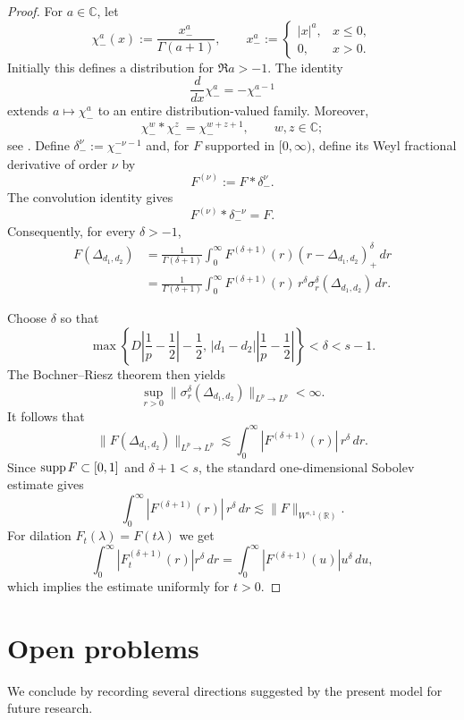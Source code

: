 \documentclass[12pt]{amsart}
\newcommand\Lapd{\Delta_{d_1, d_2}}
\newcommand{\supp}{{\rm supp}{\hspace{.05cm}}}
\begin{document}
\begin{proof}
For \(a\in\mathbb C\), let
\[
    \chi_-^a(x)
    :=
    \frac{x_-^a}{\Gamma(a+1)},
    \qquad
    x_-^a
    :=
    \begin{cases}
        |x|^a, & x\leq 0,\\
        0,     & x>0.
    \end{cases}
\]
Initially this defines a distribution for \(\Re a>-1\). The identity
\[
    \frac{d}{dx}\chi_-^a=-\chi_-^{a-1}
\]
extends \(a\mapsto\chi_-^a\) to an entire distribution-valued family.
Moreover,
\[
    \chi_-^w*\chi_-^z=\chi_-^{w+z+1},
    \qquad w,z\in\mathbb C;
\]
see \cite[(3.4.10)]{Hormander}. Define $\delta_-^\nu:=\chi_-^{-\nu-1}$
and, for \(F\) supported in \([0,\infty)\), define its Weyl fractional
derivative of order \(\nu\) by
\[
    F^{(\nu)}:=F*\delta_-^\nu.
\]
The convolution identity gives
\[
    F^{(\nu)}*\delta_-^{-\nu}=F.
\]
Consequently, for every \(\delta>-1\),
\[
\begin{aligned}
    F(\Lapd)
    &=
    \frac{1}{\Gamma(\delta+1)}
    \int_0^\infty
        F^{(\delta+1)}(r)
        (r-\Lapd)_+^\delta\,dr \\
    &=
    \frac{1}{\Gamma(\delta+1)}
    \int_0^\infty
        F^{(\delta+1)}(r)\,
        r^\delta
        \sigma_r^\delta(\Lapd)\,dr .
\end{aligned}
\]

Choose \(\delta\) so that
\[
    \max\left\{
        D\left|\frac1p-\frac12\right|-\frac12,\,
        |d_1-d_2|
        \left|\frac1p-\frac12\right|
    \right\}
    <\delta<s-1.
\]
The Bochner--Riesz theorem then yields
\[
    \sup_{r>0}
    \|\sigma_r^\delta(\Lapd)\|_{L^p\to L^p}
    <\infty.
\]
It follows that
\[
    \|F(\Lapd)\|_{L^p\to L^p}
    \lesssim
    \int_0^\infty
        |F^{(\delta+1)}(r)|\,r^\delta\,dr.
\]
Since \(\supp F\subset[0,1]\) and \(\delta+1<s\), the standard
one-dimensional Sobolev estimate gives
\[
    \int_0^\infty
        |F^{(\delta+1)}(r)|\,r^\delta\,dr
    \lesssim
    \|F\|_{W^{s,1}(\mathbb R)}.
\]
For dilation \(F_t(\lambda)=F(t\lambda)\) we get
$$
\int_0^\infty
\left|F_t^{(\delta+1)}(r)\right|r^\delta\,dr
=
\int_0^\infty
\left|F^{(\delta+1)}(u)\right|u^\delta\,du,
$$
which implies  the estimate uniformly for \(t>0\).
\end{proof}








\section{Open problems}\label{oppr}
We conclude by recording several directions suggested by the present model for future research.
\medskip 
\end{document}
